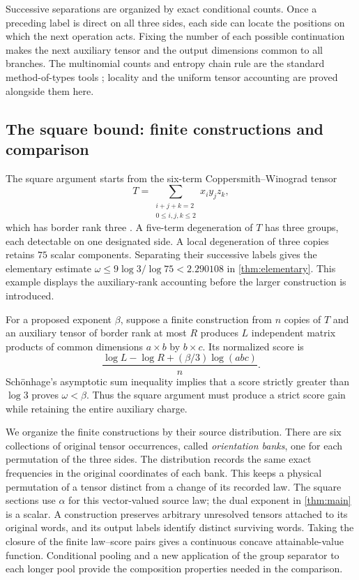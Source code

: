 Successive separations are organized by exact conditional counts.
Once a preceding label is direct on all three sides, each side can
locate the positions on which the next operation acts.  Fixing the
number of each possible continuation makes the next auxiliary tensor
and the output dimensions common to all branches.  The multinomial
counts and entropy chain rule are the standard method-of-types
tools \cite{shannon1948,csiszar1998}; locality and the uniform tensor
accounting are proved alongside them here.

\subsection{The square bound: finite constructions and comparison}

The square argument starts from the six-term Coppersmith--Winograd
tensor
\[
 T=\sum_{\substack{i+j+k=2\\0\le i,j,k\le2}}x_i y_j z_k,
\]
which has border rank three \cite[Section~7, equation~(10)]{cw}.
A five-term degeneration of \(T\) has three groups, each detectable
on one designated side.  A local degeneration of three copies retains
\(75\) scalar components.  Separating their successive labels gives
the elementary estimate
\(\omega\le9\log3/\log75<2.290108\)
in \cref{thm:elementary}.  This example displays the auxiliary-rank
accounting before the larger construction is introduced.

For a proposed exponent \(\beta\), suppose a finite construction
from \(n\) copies of \(T\) and an auxiliary tensor of border rank
at most \(R\) produces \(L\) independent matrix products of common
dimensions \(a\times b\) by \(b\times c\).  Its normalized score is
\[
 \frac{\log L-\log R+(\beta/3)\log(abc)}{n}.
\]
Sch\"onhage's asymptotic sum inequality implies that a score strictly
greater than \(\log3\) proves \(\omega<\beta\).
Thus the square argument must produce a strict score gain while
retaining the entire auxiliary charge.

We organize the finite constructions by their source distribution.
There are six collections of original tensor occurrences, called
\emph{orientation banks}, one for each permutation of the three
sides.  The distribution records the same exact frequencies in the
original coordinates of each bank.  This keeps a physical permutation
of a tensor distinct from a change of its recorded law.  The square
sections use \(\alpha\) for this vector-valued source law; the dual
exponent in \cref{thm:main} is a scalar.  A construction
preserves arbitrary unresolved tensors attached to its original words,
and its output labels identify distinct surviving words.
Taking the closure of the finite law--score pairs gives a continuous
concave attainable-value function.  Conditional pooling and a new
application of the group separator to each longer pool provide the
composition properties needed in the comparison.

